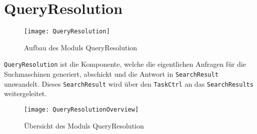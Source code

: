 
\section{QueryResolution}

\begin{figure}[htb]
    	\centering
  	\texttt{[image: QueryResolution]}
  	\caption{Aufbau des Moduls QueryResolution}
\end{figure}

\lstinline|QueryResolution| ist die Komponente, welche die eigentlichen Anfragen für die Suchmaschinen generiert, abschickt und die Antwort in \lstinline|SearchResult| umwandelt. Dieses \lstinline|SearchResult| wird über den \lstinline|TaskCtrl| an das \lstinline|SearchResults| weitergeleitet.

\begin{figure}[htb]
    \centering
  	\texttt{[image: QueryResolutionOverview]}
  	\caption{Übersicht des Moduls QueryResolution}
\end{figure}

%

\clearpage


